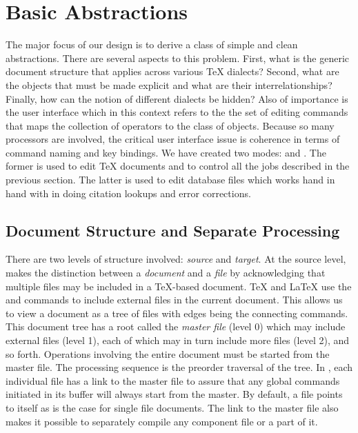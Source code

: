 \section{Basic Abstractions}
The major focus of our design is to derive a class of simple and clean
abstractions.
There are several aspects to this problem.  First, what is the generic document
structure that applies across various {\TeX} dialects?  Second, what are the
objects that must be made explicit and what are their interrelationships?
Finally, how can the notion of different dialects be hidden?
Also of importance is the user interface which in this context refers to
the the set of editing commands that maps the collection of operators to the
class of objects.
Because so many processors are involved, the critical user interface issue is
coherence in terms of command naming and key bindings.
We have created two {\emacs} modes: {\TM} and {\BM}.  The former is used
to edit {\TeX} documents and to control all the jobs described in the previous
section.  The latter is used to edit {\BibTeX} database files which works
hand in hand with {\TM} in doing citation lookups and error corrections.

\subsection{Document Structure and Separate Processing}
There are two levels of structure involved: {\it source\/} and {\it target\/}.
At the source level, {\TM} makes the distinction between a {\it document\/} 
and a {\it file\/} by acknowledging that multiple files may be included in a
{\TeX}-based document.  {\TeX} and {\LaTeX} 
use the \verb|| and \verb|| commands to include
external files in the current document.
This allows us to view a
document as a tree of files with edges being the connecting commands.
This document tree has a root called the {\it master file\/} (level 0) which
may include external files (level 1), each of which may in turn include more
files (level 2), and so forth.
Operations involving the entire document must be started from the
master file.  The processing sequence is the preorder traversal of the tree.
In {\TM}, each individual file has a link to the master file
to assure that any global commands initiated in its buffer will
always start from the master.  By default, a file points to itself as is the
case for single file documents.  The link to the master file also makes it
possible to separately compile any component file or a part of it.

